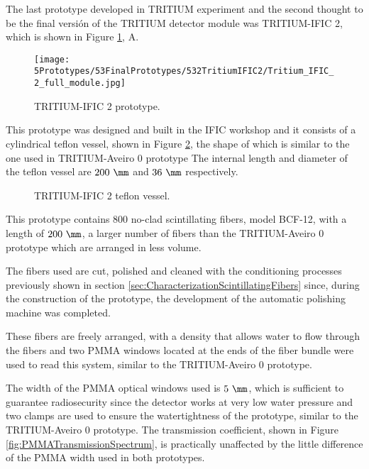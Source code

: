 The last prototype developed in TRITIUM experiment and the second thought to be the final versión of the TRITIUM detector module was TRITIUM-IFIC 2, which is shown in Figure \ref{fig:TritiumIFIC2}, A.

\begin{figure}[h]
\centering
\texttt{[image: 5Prototypes/53FinalPrototypes/532TritiumIFIC2/Tritium\_IFIC\_2\_full\_module.jpg]}
\caption{TRITIUM-IFIC 2 prototype.\label{fig:TritiumIFIC2}}
\end{figure}

This prototype was designed and built in the IFIC workshop and it consists of a cylindrical teflon vessel, shown in Figure \ref{fig:Tritium-IFIC2_vessels}, the shape of which is similar to the one used in TRITIUM-Aveiro 0 prototype The internal length and diameter of the teflon vessel are $200~\mm$ and $36~\mm$ respectively.

\begin{figure}[h]
 \centering
 \caption{TRITIUM-IFIC 2 teflon vessel.}
 \label{fig:Tritium-IFIC2_vessels}
\end{figure}

This prototype contains $800$ no-clad scintillating fibers, model BCF-12, with a length of $200~\mm$, a larger number of fibers than the TRITIUM-Aveiro 0 prototype which are arranged in less volume.

The fibers used are cut, polished and cleaned with the conditioning processes previously shown in section \ref{sec:CharacterizationScintillatingFibers} since, during the construction of the prototype, the development of the automatic polishing machine was completed.

These fibers are freely arranged, with a density that allows water to flow through the fibers and two PMMA windows located at the ends of the fiber bundle were used to read this system, similar to the TRITIUM-Aveiro 0 prototype. 

The width of the PMMA optical windows used is $5~\mm$, which is sufficient to guarantee radiosecurity since the detector works at very low water pressure and two clamps are used to ensure the watertightness of the prototype, similar to the TRITIUM-Aveiro 0 prototype. The transmission coefficient, shown in Figure \ref{fig:PMMATransmissionSpectrum}, is practically unaffected by the little difference of the PMMA width used in both prototypes.

